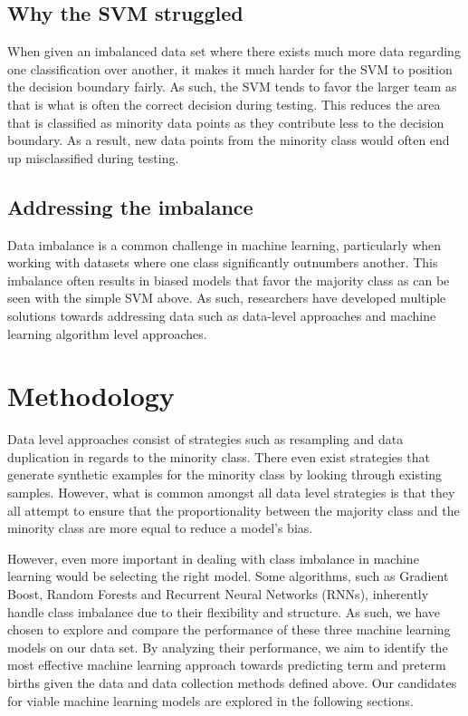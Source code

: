 \documentclass[conference]{IEEEtran}
\begin{document}
\subsection{Why the SVM struggled}
When given an imbalanced data set where there exists much more data regarding one classification over another, it makes it much harder for the SVM to position the decision boundary fairly. As such, the SVM tends to favor the larger team as that is what is often the correct decision during testing. This reduces the area that is classified as minority data points as they contribute less to the decision boundary. As a result, new data points from the minority class would often end up misclassified during testing.

\subsection{Addressing the imbalance}
Data imbalance is a common challenge in machine learning, particularly when working with datasets where one class significantly outnumbers another. This imbalance often results in biased models that favor the majority class as can be seen with the simple SVM above. As such, researchers have developed multiple solutions towards addressing data such as data-level approaches and machine learning algorithm level approaches. 

\section{Methodology}
Data level approaches consist of strategies such as resampling and data duplication in regards to the minority class. There even exist strategies that generate synthetic examples for the minority class by looking through existing samples. However, what is common amongst all data level strategies is that they all attempt to ensure that the proportionality between the majority class and the minority class are more equal to reduce a model’s bias.

However, even more important in dealing with class imbalance in machine learning would be selecting the right model. Some algorithms, such as Gradient Boost, Random Forests and Recurrent Neural Networks (RNNs), inherently handle class imbalance due to their flexibility and structure. As such, we have chosen to explore and compare the performance of these three machine learning models on our data set. By analyzing their performance, we aim to identify the most effective machine learning approach towards predicting term and preterm births given the data and data collection methods defined above. Our candidates for viable machine learning models are explored in the following sections.
\end{document}
